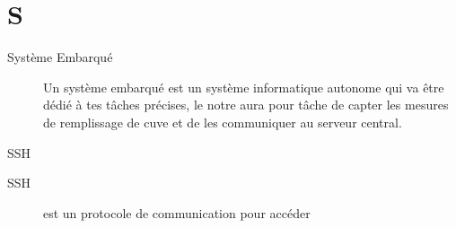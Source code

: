 \section{S}

\begin{description}

\item[Système Embarqué] Un système embarqué est un système informatique autonome
qui va être dédié à tes tâches précises, le notre aura pour tâche de capter les 
mesures de remplissage de cuve et de les communiquer au serveur central.

\end{description}

SSH

\begin{description}

\item[SSH] est un protocole de communication pour accéder 


\end{description}


